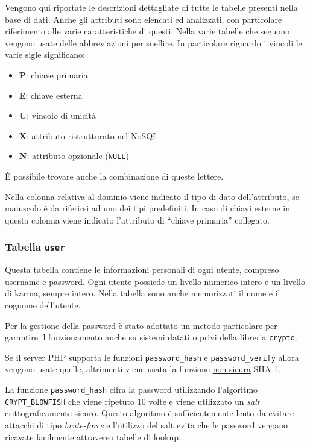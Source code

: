 Vengono qui riportate le descrizioni dettagliate di tutte le tabelle presenti nella base di dati. Anche gli attributi sono elencati ed analizzati, con particolare riferimento alle varie caratteristiche di questi. Nella varie tabelle che seguono vengono usate delle abbreviazioni per snellire. In particolare riguardo i vincoli le varie sigle significano:

\begin{itemize}
	\item \textbf{P}: chiave primaria
	\item \textbf{E}: chiave esterna
	\item \textbf{U}: vincolo di unicità
	\item \textbf{X}: attributo ristrutturato nel NoSQL
	\item \textbf{N}: attributo opzionale (\texttt{NULL})
\end{itemize}

È possibile trovare anche la combinazione di queste lettere.

Nella colonna relativa al dominio viene indicato il tipo di dato dell'attributo, se maiuscolo è da riferirsi ad uno dei tipi predefiniti. In caso di chiavi esterne in questa colonna viene indicato l'attributo di ``chiave primaria'' collegato.

\subsubsection{Tabella \texttt{user}}

Questa tabella contiene le informazioni personali di ogni utente, compreso username e password. Ogni utente possiede un livello numerico intero e un livello di karma, sempre intero. Nella tabella sono anche memorizzati il nome e il cognome dell'utente.

Per la gestione della password è stato adottato un metodo particolare per garantire il funzionamento anche su sistemi datati o privi della libreria \texttt{crypto}. 

Se il server PHP supporta le funzioni \texttt{password\_hash} e \texttt{password\_verify} allora vengono usate quelle, altrimenti viene usata la funzione \underline{non sicura} SHA-1.

La funzione \texttt{password\_hash} cifra la password utilizzando l'algoritmo \texttt{CRYPT\_BLOWFISH} che viene ripetuto 10 volte e viene utilizzato un \emph{salt} crittograficamente sicuro. Questo algoritmo è sufficientemente lento da evitare attacchi di tipo \emph{brute-force} e l'utilizzo del salt evita che le password vengano ricavate facilmente attraverso tabelle di lookup.

